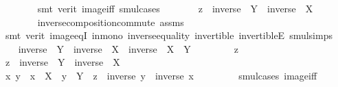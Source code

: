 \begin{isabellebody}
\ \ \ \ \ \ \isamarkupfalse%
\ {\isacharparenleft}{\kern0pt}smt\ {\isacharparenleft}{\kern0pt}verit{\isacharparenright}{\kern0pt}\ image{\isacharunderscore}{\kern0pt}iff\ smul{\isachardot}{\kern0pt}cases{\isacharparenright}{\kern0pt}\isanewline
\ \ \ \ \isamarkupfalse%
\ \isamarkupfalse%
\ {\isachardoublequoteopen}z\ {\isasymin}\ {\isacharparenleft}{\kern0pt}inverse\ {\isacharbackquote}{\kern0pt}\ Y{\isacharparenright}{\kern0pt}\ {\isasymcdots}\ {\isacharparenleft}{\kern0pt}inverse\ {\isacharbackquote}{\kern0pt}\ X{\isacharparenright}{\kern0pt}{\isachardoublequoteclose}\ \isanewline
\ \ \ \ \ \ \isamarkupfalse%
\ inverse{\isacharunderscore}{\kern0pt}composition{\isacharunderscore}{\kern0pt}commute\ assms\ \isanewline
\ \ \ \ \ \ \isamarkupfalse%
\ {\isacharparenleft}{\kern0pt}smt\ {\isacharparenleft}{\kern0pt}verit{\isacharparenright}{\kern0pt}\ image{\isacharunderscore}{\kern0pt}eqI\ in{\isacharunderscore}{\kern0pt}mono\ inverse{\isacharunderscore}{\kern0pt}equality\ invertible\ invertibleE\ smul{\isachardot}{\kern0pt}simps{\isacharparenright}{\kern0pt}\isanewline
\ \ \isamarkupfalse%
\isanewline
\ \ \isamarkupfalse%
\ {\isachardoublequoteopen}{\isacharparenleft}{\kern0pt}inverse\ {\isacharbackquote}{\kern0pt}\ Y{\isacharparenright}{\kern0pt}\ {\isasymcdots}\ {\isacharparenleft}{\kern0pt}inverse\ {\isacharbackquote}{\kern0pt}\ X{\isacharparenright}{\kern0pt}\ {\isasymsubseteq}\ inverse\ {\isacharbackquote}{\kern0pt}\ {\isacharparenleft}{\kern0pt}X\ {\isasymcdots}\ Y{\isacharparenright}{\kern0pt}{\isachardoublequoteclose}\isanewline
\ \ \isamarkupfalse%
\isanewline
\ \ \ \ \isamarkupfalse%
\ z\ \isamarkupfalse%
\ {\isachardoublequoteopen}z\ {\isasymin}\ {\isacharparenleft}{\kern0pt}inverse\ {\isacharbackquote}{\kern0pt}\ Y{\isacharparenright}{\kern0pt}\ {\isasymcdots}\ {\isacharparenleft}{\kern0pt}inverse\ {\isacharbackquote}{\kern0pt}\ X{\isacharparenright}{\kern0pt}{\isachardoublequoteclose}\isanewline
\ \ \ \ \isamarkupfalse%
\ \isamarkupfalse%
\ x\ y\ \ {\isachardoublequoteopen}x\ {\isasymin}\ X{\isachardoublequoteclose}\ \ {\isachardoublequoteopen}y\ {\isasymin}\ Y{\isachardoublequoteclose}\ \ {\isachardoublequoteopen}z\ {\isacharequal}{\kern0pt}\ inverse\ y\ {\isasymcdot}\ inverse\ x{\isachardoublequoteclose}\ \isanewline
\ \ \ \ \ \ \isamarkupfalse%
\ smul{\isachardot}{\kern0pt}cases\ image{\isacharunderscore}{\kern0pt}iff\ \isamarkupfalse%

\end{isabellebody}
